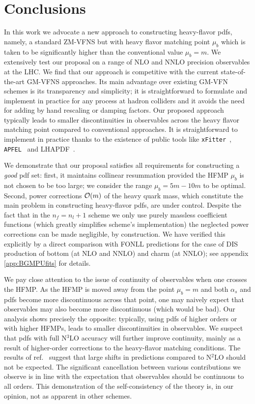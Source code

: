 \documentclass[letter,11pt]{article}
\def\as{\alpha_s}
\def\nf{{n_f}}
\def\nl{{n_l}}
\def\mub{\mu_b}
\begin{document}
\section{Conclusions}


In this work we advocate a new approach to constructing heavy-flavor pdfs, namely, a standard ZM-VFNS but with heavy flavor matching point $\mub$ which is taken to be significantly higher than the conventional value $\mub=m$. We extensively test our proposal on a range of NLO and NNLO precision observables at the LHC. We find that our approach is competitive with the current state-of-the-art GM-VFNS approaches. Its main advantage over existing GM-VFN schemes is its transparency and simplicity; it is straightforward to formulate and implement in practice for any process at hadron colliders and it avoids the need for adding by hand rescaling or damping factors. Our proposed approach typically leads to smaller discontinuities in observables across the heavy flavor matching point compared to conventional approaches. It is straightforward to implement in practice  thanks to the existence of public tools like {\tt xFitter}~\cite{Alekhin:2014irh},  {\tt APFEL}~\cite{Bertone:2013vaa} and LHAPDF~\cite{Buckley:2014ana}.

We demonstrate that our proposal satisfies all requirements for constructing a {\it good} pdf set: first, it maintains collinear resummation provided the HFMP $\mub$ is not chosen to be too large; we consider the range $\mub=5m-10m$ to be optimal. Second, power corrections ${\cal O}(m)$ of the heavy quark mass, which constitute the main problem in constructing heavy-flavor pdfs, are under control. Despite the fact that in the $\nf=\nl+1$ scheme we only use purely massless coefficient functions (which greatly simplifies scheme's implementation) the neglected power corrections can be made negligible, by construction. We have verified this explicitly by a direct comparison with FONLL predictions for the case of DIS production of bottom (at NLO and NNLO) and charm (at NNLO); see appendix \ref{app:BGMPUfits} for details.

We pay close attention to the issue of continuity of observables when one crosses the HFMP. As the HFMP is moved away from the point $\mub=m$ and both $\as$ and pdfs become more discontinuous across that point, one may naively expect that observables may also become more discontinuous (which would be bad). Our analysis shows precisely the opposite: typically, using pdfs of higher orders or with higher HFMPs, leads to smaller discontinuities in observables. We suspect that pdfs with full N$^3$LO accuracy will further improve continuity, mainly as a result of higher-order corrections to the heavy-flavor matching conditions. The results of ref.~\cite{Forte:2013mda} suggest that large shifts in predictions compared to N$^2$LO should not be expected. The significant cancellation between various contributions we observe is in line with the expectation that observables should be continuous to all orders. This demonstration of the self-consistency of the theory is, in our opinion, not as apparent in other schemes.
\end{document}

